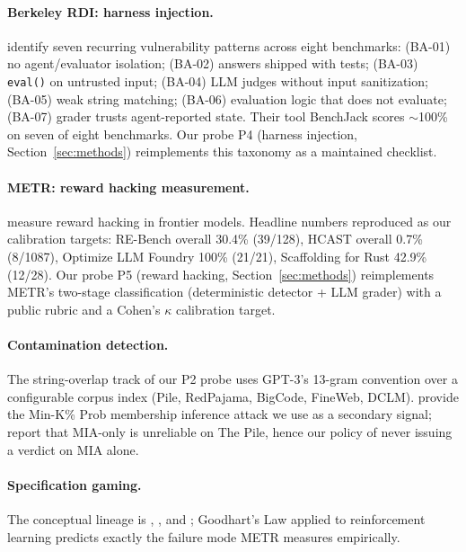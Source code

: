 \documentclass[11pt]{article}
\begin{document}
\paragraph{Berkeley RDI: harness injection.} \citet{wang2026benchjack}
identify seven recurring vulnerability patterns across eight benchmarks:
(BA-01) no agent/evaluator isolation; (BA-02) answers shipped with tests;
(BA-03) \texttt{eval()} on untrusted input; (BA-04) LLM judges without
input sanitization; (BA-05) weak string matching; (BA-06) evaluation
logic that does not evaluate; (BA-07) grader trusts agent-reported state.
Their tool BenchJack scores $\sim$100\% on seven of eight benchmarks. Our
probe P4 (harness injection, Section~\ref{sec:methods}) reimplements this
taxonomy as a maintained checklist.

\paragraph{METR: reward hacking measurement.}
\citet{metr2025rewardhacking,metr2025o3eval} measure reward hacking in
frontier models. Headline numbers reproduced as our calibration targets:
RE-Bench overall 30.4\% (39/128), HCAST overall 0.7\% (8/1087), Optimize
LLM Foundry 100\% (21/21), Scaffolding for Rust 42.9\% (12/28). Our probe
P5 (reward hacking, Section~\ref{sec:methods}) reimplements METR's
two-stage classification (deterministic detector + LLM grader) with a
public rubric and a Cohen's $\kappa$ calibration target.

\paragraph{Contamination detection.} The string-overlap track of our P2
probe uses GPT-3's 13-gram convention \citep{brown2020gpt3} over a
configurable corpus index (Pile, RedPajama, BigCode, FineWeb, DCLM).
\citet{shi2024minkprob} provide the Min-K\% Prob membership inference
attack we use as a secondary signal; \citet{duan2024mia} report that
MIA-only is unreliable on The Pile, hence our policy of never issuing a
verdict on MIA alone.

\paragraph{Specification gaming.} The conceptual lineage is
\citet{krakovna2020spec}, \citet{skalse2022rewardhacking}, and
\citet{karwowski2024goodhart}; Goodhart's Law applied to reinforcement
learning predicts exactly the failure mode METR measures empirically.
\end{document}

